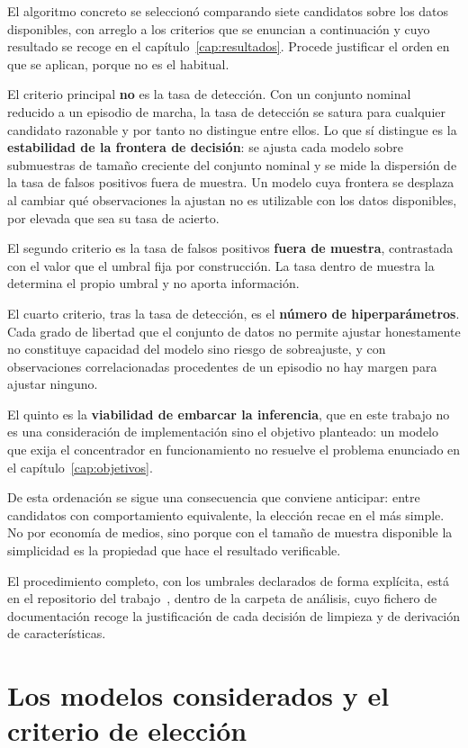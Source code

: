 El algoritmo concreto se seleccionó comparando siete candidatos sobre los datos disponibles,
con arreglo a los criterios que se enuncian a continuación y cuyo resultado se recoge en el
capítulo~\ref{cap:resultados}. Procede justificar el orden en que se aplican, porque no es el
habitual.

El criterio principal \textbf{no} es la tasa de detección. Con un conjunto nominal reducido a
un episodio de marcha, la tasa de detección se satura para cualquier candidato razonable y por
tanto no distingue entre ellos. Lo que sí distingue es la \textbf{estabilidad de la frontera de
decisión}: se ajusta cada modelo sobre submuestras de tamaño creciente del conjunto nominal y
se mide la dispersión de la tasa de falsos positivos fuera de muestra. Un modelo cuya frontera
se desplaza al cambiar qué observaciones la ajustan no es utilizable con los datos disponibles,
por elevada que sea su tasa de acierto.

El segundo criterio es la tasa de falsos positivos \textbf{fuera de muestra}, contrastada con
el valor que el umbral fija por construcción. La tasa dentro de muestra la determina el propio
umbral y no aporta información.

El cuarto criterio, tras la tasa de detección, es el \textbf{número de hiperparámetros}. Cada
grado de libertad que el conjunto de datos no permite ajustar honestamente no constituye
capacidad del modelo sino riesgo de sobreajuste, y con observaciones correlacionadas
procedentes de un episodio no hay margen para ajustar ninguno.

El quinto es la \textbf{viabilidad de embarcar la inferencia}, que en este trabajo no es una
consideración de implementación sino el objetivo planteado: un modelo que exija el
concentrador en funcionamiento no resuelve el problema enunciado en el
capítulo~\ref{cap:objetivos}.

De esta ordenación se sigue una consecuencia que conviene anticipar: entre candidatos con
comportamiento equivalente, la elección recae en el más simple. No por economía de medios, sino
porque con el tamaño de muestra disponible la simplicidad es la propiedad que hace el resultado
verificable.

El procedimiento completo, con los umbrales declarados de forma explícita, está en
el repositorio del trabajo~\cite{repotfm}, dentro de la carpeta de análisis, cuyo fichero de
documentación recoge la justificación de cada decisión de limpieza y de derivación de
características.

\section{Los modelos considerados y el criterio de elección}

